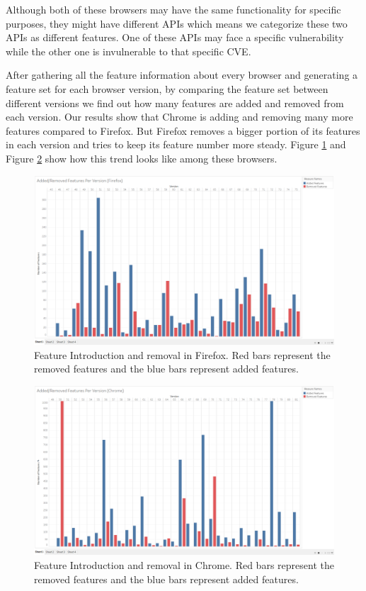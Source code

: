   Although both of these browsers may have the same functionality for specific purposes, they might have different APIs which means we categorize these two APIs as different features. One of these APIs may face a specific vulnerability while the other one is invulnerable to that specific CVE.

After gathering all the feature information about every browser and generating a feature set for each browser version, by comparing the feature set between different versions we find out how many features are added and removed from each version. Our results show that Chrome is adding and removing many more features compared to Firefox. But Firefox removes a bigger portion of its features in each version and tries to keep its feature number more steady. Figure \ref{fig:ffaddremove} and Figure \ref{fig:chaddremove} show how this trend looks like among these browsers.

\begin{figure}[ht]
    \centering
    \includegraphics[width=\columnwidth]{figures/Firefox-add-remove.png}
    \caption{Feature Introduction and removal in Firefox. Red bars represent the removed features and the blue bars represent added features.}
    \label{fig:ffaddremove}
\end{figure}

\begin{figure}[ht]
    \centering
    \includegraphics[width=\columnwidth]{figures/Chrome-add-remove.png}
    \caption{Feature Introduction and removal in Chrome. Red bars represent the removed features and the blue bars represent added features.}
    \label{fig:chaddremove}
\end{figure}

